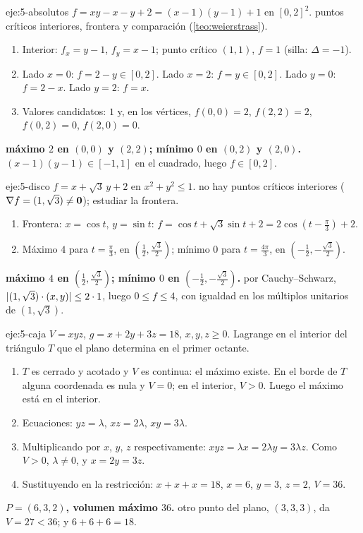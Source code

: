 \begin{solucion}{eje:5-absolutos}
\datos $f=xy-x-y+2=(x-1)(y-1)+1$ en $[0,2]^2$.
\planteamiento puntos críticos interiores, frontera y comparación (\cref{teo:weierstrass}).
\pasos
\begin{enumerate}[label=\arabic*.]
  \item Interior: $f_x=y-1$, $f_y=x-1$; punto crítico $(1,1)$, $f=1$ (silla: $\Delta=-1$).
  \item Lado $x=0$: $f=2-y\in[0,2]$. Lado $x=2$: $f=y\in[0,2]$. Lado $y=0$: $f=2-x$. Lado $y=2$: $f=x$.
  \item Valores candidatos: $1$ y, en los vértices, $f(0,0)=2$, $f(2,2)=2$, $f(0,2)=0$, $f(2,0)=0$.
\end{enumerate}
\resultado \textbf{máximo $2$ en $(0,0)$ y $(2,2)$; mínimo $0$ en $(0,2)$ y $(2,0)$.}
\comprobacion $(x-1)(y-1)\in[-1,1]$ en el cuadrado, luego $f\in[0,2]$.
\end{solucion}

\begin{solucion}{eje:5-disco}
\datos $f=x+\sqrt3\,y+2$ en $x^2+y^2\le1$.
\planteamiento no hay puntos críticos interiores ($\nabla f=(1,\sqrt3)\neq\mathbf{0}$); estudiar la frontera.
\pasos
\begin{enumerate}[label=\arabic*.]
  \item Frontera: $x=\cos t$, $y=\sin t$: $f=\cos t+\sqrt3\sin t+2=2\cos(t-\frac\pi3)+2$.
  \item Máximo $4$ para $t=\frac\pi3$, en $(\frac12,\frac{\sqrt3}2)$; mínimo $0$ para $t=\frac{4\pi}3$, en $(-\frac12,-\frac{\sqrt3}2)$.
\end{enumerate}
\resultado \textbf{máximo $4$ en $(\frac12,\frac{\sqrt3}2)$; mínimo $0$ en $(-\frac12,-\frac{\sqrt3}2)$.}
\comprobacion por Cauchy--Schwarz, $\lvert(1,\sqrt3)\cdot(x,y)\rvert\le2\cdot1$, luego $0\le f\le4$, con igualdad en los múltiplos unitarios de $(1,\sqrt3)$.
\end{solucion}

\begin{solucion}{eje:5-caja}
\datos $V=xyz$, $g=x+2y+3z=18$, $x,y,z\ge0$.
\planteamiento Lagrange en el interior del triángulo $T$ que el plano determina en el primer octante.
\pasos
\begin{enumerate}[label=\arabic*.]
  \item $T$ es cerrado y acotado y $V$ es continua: el máximo existe. En el borde de $T$ alguna coordenada es nula y $V=0$; en el interior, $V>0$. Luego el máximo está en el interior.
  \item Ecuaciones: $yz=\lambda$, $xz=2\lambda$, $xy=3\lambda$.
  \item Multiplicando por $x$, $y$, $z$ respectivamente: $xyz=\lambda x=2\lambda y=3\lambda z$. Como $V>0$, $\lambda\neq0$, y $x=2y=3z$.
  \item Sustituyendo en la restricción: $x+x+x=18$, $x=6$, $y=3$, $z=2$, $V=36$.
\end{enumerate}
\resultado \textbf{$P=(6,3,2)$, volumen máximo $36$.}
\comprobacion otro punto del plano, $(3,3,3)$, da $V=27<36$; y $6+6+6=18$.
\end{solucion}

